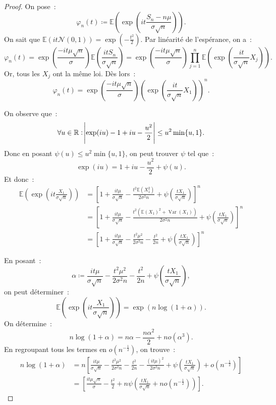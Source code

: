 \documentclass{article}
\newcommand{\E}{\mathbb E}
\newcommand{\R}{\mathbb R}
\newcommand{\Nzu}{\mathcal N(0, 1)}  %
\DeclareMathOperator{\Var}{Var}
\theoremstyle{definition}
\theoremstyle{remark}
\begin{document}
		\begin{proof} On pose~:
		\[\varphi_n(t) \coloneqq \E\left(\exp\left(it\frac {S_n - n\mu}{\sigma\sqrt n}\right)\right).\]
		On sait que $\E(it\Nzu) = \exp\left(-\frac {t^2}2\right)$. Par linéarité de l'espérance, on a~:
		\[\varphi_n(t) = \exp\left(\frac {-it\mu\sqrt n}\sigma\right)\E\left(\frac {itS_n}{\sigma\sqrt n}\right)
		= \exp\left(\frac {-it\mu\sqrt n}\sigma\right)\prod_{j=1}^n\E\left(\exp\left(\frac {it}{\sigma\sqrt n}X_j\right)\right).\]
		Or, tous les $X_j$ ont la même loi. Dès lors~:
		\[\varphi_n(t) = \exp\left(\frac {-it\mu\sqrt n}\sigma\right)\left(\exp\left(\frac {it}{\sigma\sqrt n}X_1\right)\right)^n.\]

		On observe que~:
		\[\forall u \in \R : \abs{\exp(iu) - 1 + iu - \frac {u^2}2} \leq u^2\min\{u, 1\}.\]
		Donc en posant $\psi(u) \leq u^2\min\{u, 1\}$, on peut trouver $\psi$ tel que~:
		\[\exp(iu) = 1 + iu - \frac {u^2}2 + \psi(u).\]
		Et donc~:
		\begin{align*}\E\left(\exp\left(it\frac {X_1}{\sigma \sqrt n}\right)\right)
		 &= \left[1 + \frac {it\mu}{\sigma\sqrt n} - \frac {t^2\E(X_1^2)}{2\sigma^2n} + \psi\left(\frac {tX_1}{\sigma \sqrt n}\right)\right]^n \\
		 &= \left[1 + \frac {it\mu}{\sigma\sqrt n} - \frac {t^2(\E(X_1)^2 + \Var(X_1))}{2\sigma^2n} + \psi\left(\frac {tX_1}{\sigma \sqrt n}\right)\right]^n \\
		 &= \left[1 + \frac {it\mu}{\sigma\sqrt n} - \frac {t^2\mu^2}{2\sigma^2n} - \frac {t^2}{2n} + \psi\left(\frac {tX_1}{\sigma \sqrt n}\right)\right]^n
		\end{align*}

		En posant~:
		\[\alpha \coloneqq \frac {it\mu}{\sigma\sqrt n} - \frac {t^2\mu^2}{2\sigma^2n} - \frac {t^2}{2n} + \psi\left(\frac {tX_1}{\sigma \sqrt n}\right),\]
		on peut déterminer~:
		\[\E\left(\exp\left(it\frac {X_1}{\sigma\sqrt n}\right)\right) = \exp\left(n\log(1 + \alpha)\right).\]
		On détermine~:
		\[n\log(1 + \alpha) = n\alpha - \frac {n\alpha^2}2 + no(\alpha^3).\]
		En regroupant tous les termes en $o(n^{-\frac 12})$, on trouve~:
		\begin{align*}
			n\log(1 + \alpha) &= n\left[\frac {it\mu}{\sigma\sqrt n} - \frac {t^2\mu^2}{2\sigma^2n} - \frac {t^2}{2n} - \frac {(it\mu)^2}{2\sigma^2n} +
				\psi\left(\frac {tX_1}{\sigma \sqrt n}\right) + o(n^{-\frac 12})\right] \\
			&= \left[\frac {it\mu\sqrt n}\sigma - \frac {t^2}2 + n\psi\left(\frac {tX_1}{\sigma\sqrt n} + no(n^{-\frac 12})\right)\right].
		\end{align*}


\end{proof}
\end{document}
